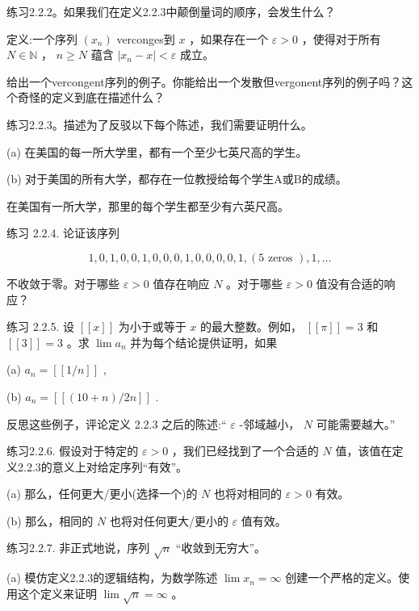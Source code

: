 练习2.2.2。如果我们在定义2.2.3中颠倒量词的顺序，会发生什么？

定义:一个序列 \(\left( {x}_{n}\right)\) verconges到 \(x\) ，如果存在一个 \(\varepsilon  > 0\) ，使得对于所有 \(N \in  \mathbb{N}\) ， \(n \geq  N\) 蕴含 \(\left| {{x}_{n} - x}\right|  < \varepsilon\) 成立。

给出一个vercongent序列的例子。你能给出一个发散但vergonent序列的例子吗？这个奇怪的定义到底在描述什么？

练习2.2.3。描述为了反驳以下每个陈述，我们需要证明什么。

(a) 在美国的每一所大学里，都有一个至少七英尺高的学生。

(b) 对于美国的所有大学，都存在一位教授给每个学生A或B的成绩。

在美国有一所大学，那里的每个学生都至少有六英尺高。

练习 2.2.4. 论证该序列

\[
1,0,1,0,0,1,0,0,0,1,0,0,0,0,1,\left( {5\text{ zeros }}\right) ,1,\ldots
\]

不收敛于零。对于哪些 \(\varepsilon  > 0\) 值存在响应 \(N\) 。对于哪些 \(\varepsilon  > 0\) 值没有合适的响应？

练习 2.2.5. 设 \(\left\lbrack  \left\lbrack  x\right\rbrack  \right\rbrack\) 为小于或等于 \(x\) 的最大整数。例如， \(\left\lbrack  \left\lbrack  \pi \right\rbrack  \right\rbrack   = 3\) 和 \(\left\lbrack  \left\lbrack  3\right\rbrack  \right\rbrack   = 3\) 。求 \(\lim {a}_{n}\) 并为每个结论提供证明，如果

(a) \({a}_{n} = \left\lbrack  \left\lbrack  {1/n}\right\rbrack  \right\rbrack\) ,

(b) \({a}_{n} = \left\lbrack  \left\lbrack  {\left( {{10} + n}\right) /{2n}}\right\rbrack  \right\rbrack\) .

反思这些例子，评论定义 2.2.3 之后的陈述:“ \(\varepsilon\) -邻域越小， \(N\) 可能需要越大。”

练习2.2.6. 假设对于特定的 \(\varepsilon  > 0\) ，我们已经找到了一个合适的 \(N\) 值，该值在定义2.2.3的意义上对给定序列“有效”。

(a) 那么，任何更大/更小(选择一个)的 \(N\) 也将对相同的 \(\varepsilon  > 0\) 有效。

(b) 那么，相同的 \(N\) 也将对任何更大/更小的 \(\varepsilon\) 值有效。

练习2.2.7. 非正式地说，序列 \(\sqrt{n}\) “收敛到无穷大”。

(a) 模仿定义2.2.3的逻辑结构，为数学陈述 \(\lim {x}_{n} = \infty\) 创建一个严格的定义。使用这个定义来证明 \(\lim \sqrt{n} = \infty\) 。

